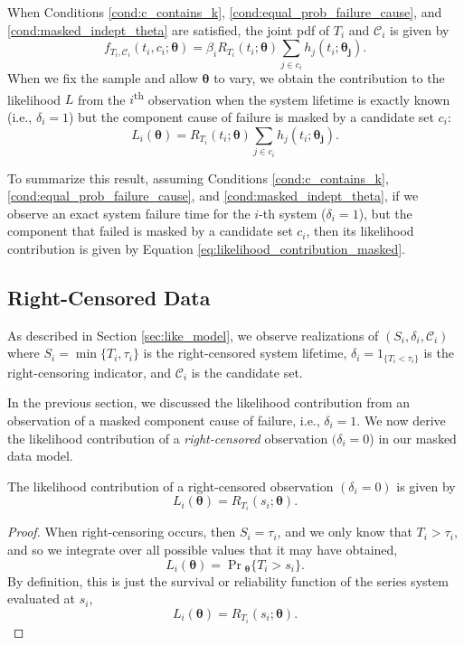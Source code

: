 \documentclass[
]{article}
\begin{document}
When Conditions \ref{cond:c_contains_k},
\ref{cond:equal_prob_failure_cause}, and \ref{cond:masked_indept_theta}
are satisfied, the joint pdf of \(T_i\) and \(\mathcal{C}_i\) is given
by \[
f_{T_i,\mathcal{C}_i}(t_i,c_i;\boldsymbol{\theta}) =
    \beta_i R_{T_i}(t_i;\boldsymbol{\theta})
    \sum_{j \in c_i} h_j(t_i;\boldsymbol{\theta_j}).
\] When we fix the sample and allow \(\boldsymbol{\theta}\) to vary, we
obtain the contribution to the likelihood \(L\) from the
\(i\)\textsuperscript{th} observation when the system lifetime is
exactly known (i.e., \(\delta_i = 1\)) but the component cause of
failure is masked by a candidate set \(c_i\): \begin{equation}
\label{eq:likelihood_contribution_masked}
L_i(\boldsymbol{\theta}) = R_{T_i}(t_i;\boldsymbol{\theta}) \sum_{j \in c_i} h_j(t_i;\boldsymbol{\theta_j}).
\end{equation}

To summarize this result, assuming Conditions \ref{cond:c_contains_k},
\ref{cond:equal_prob_failure_cause}, and \ref{cond:masked_indept_theta},
if we observe an exact system failure time for the \(i\)-th system
(\(\delta_i = 1\)), but the component that failed is masked by a
candidate set \(c_i\), then its likelihood contribution is given by
Equation \eqref{eq:likelihood_contribution_masked}.

\hypertarget{right-censored-data}{%
\subsection{Right-Censored Data}\label{right-censored-data}}

As described in Section \ref{sec:like_model}, we observe realizations of
\((S_i,\delta_i,\mathcal{C}_i)\) where \(S_i = \min\{T_i,\tau_i\}\) is
the right-censored system lifetime, \(\delta_i = 1_{\{T_i < \tau_i\}}\)
is the right-censoring indicator, and \(\mathcal{C}_i\) is the candidate
set.

In the previous section, we discussed the likelihood contribution from
an observation of a masked component cause of failure, i.e.,
\(\delta_i = 1\). We now derive the likelihood contribution of a
\emph{right-censored} observation \((\delta_i = 0\)) in our masked data
model.

\begin{theorem}
\label{thm:joint_s_d_c}
The likelihood contribution of a right-censored observation $(\delta_i = 0)$
is given by
\begin{equation}
L_i(\boldsymbol{\theta}) = R_{T_i}(s_i;\boldsymbol{\theta}).
\end{equation}
\end{theorem}
\begin{proof}
When right-censoring occurs, then $S_i = \tau_i$, and we only know that
$T_i > \tau_i$, and so we integrate over all possible values that it may have
obtained,
$$
L_i(\boldsymbol{\theta}) = \Pr\!{}_{\boldsymbol{\theta}}\{T_i > s_i\}.
$$
By definition, this is just the survival or reliability function of the series system
evaluated at $s_i$,
$$
L_i(\boldsymbol{\theta}) = R_{T_i}(s_i;\boldsymbol{\theta}).
$$
\end{proof}
\end{document}
